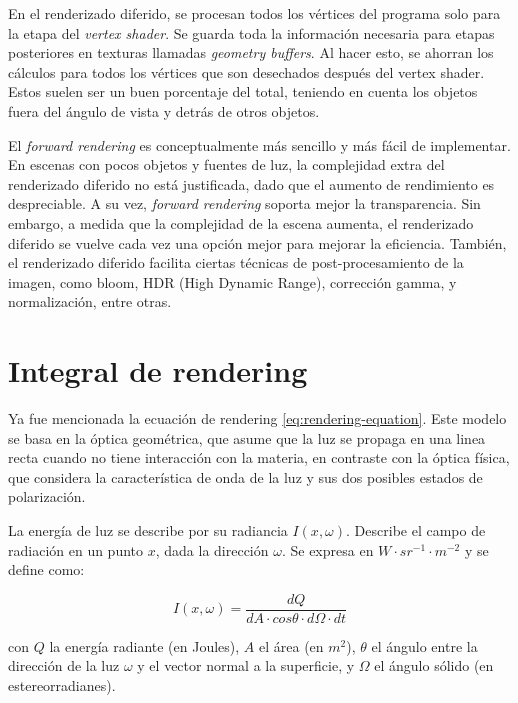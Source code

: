 En el renderizado diferido, se procesan todos los vértices del programa solo para la etapa del \textit{vertex shader}.
Se guarda toda la información necesaria para etapas posteriores en texturas llamadas \textit{geometry buffers}.
Al hacer esto, se ahorran los cálculos para todos los vértices que son desechados después del vertex shader. %
Estos suelen ser un buen porcentaje del total, teniendo en cuenta los objetos fuera del ángulo de vista y detrás de otros objetos.

El \textit{forward rendering} es conceptualmente más sencillo y más fácil de implementar.
En escenas con pocos objetos y fuentes de luz, la complejidad extra del renderizado diferido no está justificada, dado que el aumento de rendimiento es despreciable.
A su vez, \textit{forward rendering} soporta mejor la transparencia.
Sin embargo, a medida que la complejidad de la escena aumenta, el renderizado diferido se vuelve cada vez una opción mejor para mejorar la eficiencia.
También, el renderizado diferido facilita ciertas técnicas de post-procesamiento de la imagen, como bloom, HDR (High Dynamic Range), corrección gamma, y normalización, entre otras.

\section{Integral de rendering}

Ya fue mencionada la ecuación de rendering \ref{eq:rendering-equation}.
Este modelo se basa en la óptica geométrica, que asume que la luz se propaga en una linea recta cuando no tiene interacción con la materia, en contraste con la óptica física, que considera la característica de onda de la luz y sus dos posibles estados de polarización.

La energía de luz se describe por su radiancia $I(x, \omega)$.
Describe el campo de radiación en un punto $x$, dada la dirección $\omega$.
Se expresa en $W\cdot sr^{-1}\cdot m^{-2}$ y se define como:

\begin{equation}
    I(x, \omega) = \frac{dQ}{dA\cdot cos\theta\cdot d\Omega\cdot dt}
\end{equation}

con $Q$ la energía radiante (en Joules), $A$ el área (en $m^2$), $\theta$ el ángulo entre la dirección de la luz $\omega$ y el vector normal a la superficie, y $\Omega$ el ángulo sólido (en estereorradianes).

